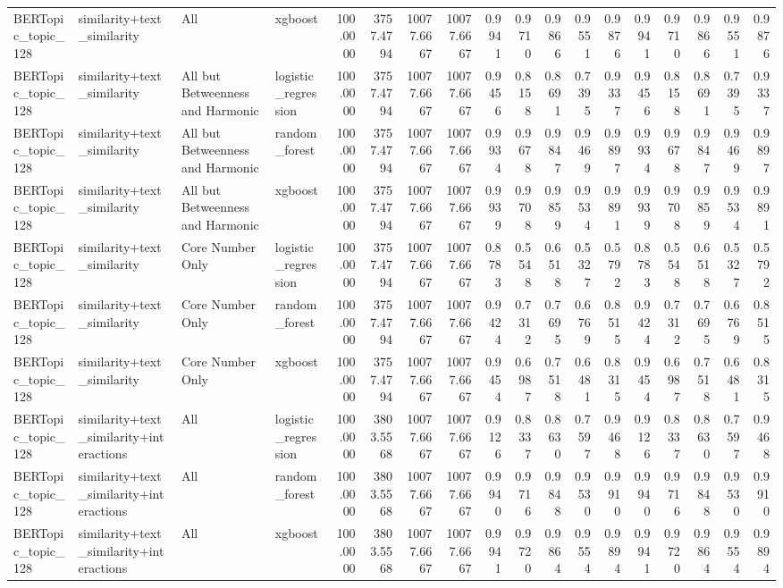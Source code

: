 \begin{tabular}{llllrrrrrrrrrrrrrr}
BERTopic_topic_128 & similarity+text_similarity & All & xgboost & 100.0000 & 3757.4794 & 10077.6667 & 10077.6667 & 0.9941 & 0.9710 & 0.9866 & 0.9551 & 0.9876 & 0.9941 & 0.9710 & 0.9866 & 0.9551 & 0.9876 \\
BERTopic_topic_128 & similarity+text_similarity & All but Betweenness and Harmonic & logistic_regression & 100.0000 & 3757.4794 & 10077.6667 & 10077.6667 & 0.9456 & 0.8158 & 0.8691 & 0.7395 & 0.9337 & 0.9456 & 0.8158 & 0.8691 & 0.7395 & 0.9337 \\
BERTopic_topic_128 & similarity+text_similarity & All but Betweenness and Harmonic & random_forest & 100.0000 & 3757.4794 & 10077.6667 & 10077.6667 & 0.9934 & 0.9678 & 0.9847 & 0.9469 & 0.9897 & 0.9934 & 0.9678 & 0.9847 & 0.9469 & 0.9897 \\
BERTopic_topic_128 & similarity+text_similarity & All but Betweenness and Harmonic & xgboost & 100.0000 & 3757.4794 & 10077.6667 & 10077.6667 & 0.9939 & 0.9708 & 0.9859 & 0.9534 & 0.9891 & 0.9939 & 0.9708 & 0.9859 & 0.9534 & 0.9891 \\
BERTopic_topic_128 & similarity+text_similarity & Core Number Only & logistic_regression & 100.0000 & 3757.4794 & 10077.6667 & 10077.6667 & 0.8783 & 0.5548 & 0.6518 & 0.5327 & 0.5792 & 0.8783 & 0.5548 & 0.6518 & 0.5327 & 0.5792 \\
BERTopic_topic_128 & similarity+text_similarity & Core Number Only & random_forest & 100.0000 & 3757.4794 & 10077.6667 & 10077.6667 & 0.9424 & 0.7312 & 0.7695 & 0.6769 & 0.8515 & 0.9424 & 0.7312 & 0.7695 & 0.6769 & 0.8515 \\
BERTopic_topic_128 & similarity+text_similarity & Core Number Only & xgboost & 100.0000 & 3757.4794 & 10077.6667 & 10077.6667 & 0.9454 & 0.6987 & 0.7518 & 0.6481 & 0.8315 & 0.9454 & 0.6987 & 0.7518 & 0.6481 & 0.8315 \\
BERTopic_topic_128 & similarity+text_similarity+interactions & All & logistic_regression & 100.0000 & 3803.5568 & 10077.6667 & 10077.6667 & 0.9126 & 0.8337 & 0.8630 & 0.7597 & 0.9468 & 0.9126 & 0.8337 & 0.8630 & 0.7597 & 0.9468 \\
BERTopic_topic_128 & similarity+text_similarity+interactions & All & random_forest & 100.0000 & 3803.5568 & 10077.6667 & 10077.6667 & 0.9940 & 0.9716 & 0.9848 & 0.9530 & 0.9910 & 0.9940 & 0.9716 & 0.9848 & 0.9530 & 0.9910 \\
BERTopic_topic_128 & similarity+text_similarity+interactions & All & xgboost & 100.0000 & 3803.5568 & 10077.6667 & 10077.6667 & 0.9941 & 0.9720 & 0.9864 & 0.9554 & 0.9894 & 0.9941 & 0.9720 & 0.9864 & 0.9554 & 0.9894 \\

\end{tabular}
